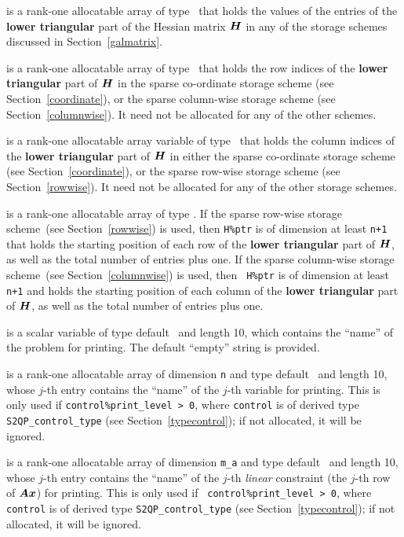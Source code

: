 \documentclass{galahad}
\newcommand{\packagename}{S2QP}
\begin{document}
\begin{description}
\begin{description}
 is a rank-one allocatable array of type \realdp\ that holds
the values of the entries of the {\bf lower triangular} part
of the Hessian matrix ${\bm{H}}$ in any of the 
storage schemes discussed in Section~\ref{galmatrix}.

 is a rank-one allocatable array of type \integer\
that holds the row indices of the {\bf lower triangular} part of
${\bm{H}}$ in the sparse co-ordinate storage scheme (see
Section~\ref{coordinate}), or the sparse column-wise storage scheme
(see Section~\ref{columnwise}).  It need not be allocated for any of
the other schemes.

 is a rank-one allocatable array variable of type \integer\
that holds the column indices of the {\bf lower triangular} part of 
${\bm{H}}$ in either the sparse co-ordinate storage scheme 
(see Section~\ref{coordinate}), or the sparse row-wise 
storage scheme (see Section~\ref{rowwise}).
It need not be allocated for any of the other storage schemes.

 is a rank-one allocatable array of type \integer.
If the sparse row-wise storage scheme~(see Section~\ref{rowwise}) is
used, then {\tt H\%ptr} is of dimension at least {\tt n+1} that holds the starting position
of each row of the {\bf lower triangular} part of ${\bm{H}}$, as well as
the total number of entries plus one.  If the sparse column-wise
storage scheme~(see Section~\ref{columnwise}) is used, then {\tt
  H\%ptr} is of dimension at least {\tt n+1} and holds the starting position of each column
of the {\bf lower triangular} part of ${\bm{H}}$, as well as the total
number of entries plus one.

\end{description}

 is a scalar variable of type 
default \character\ and length 10, which contains the
``name'' of the problem for printing. The default ``empty'' string is
provided.

 is a rank-one allocatable array of dimension {\tt n} and type 
default \character\ and length 10, whose $j$-th entry contains the
``name'' of the $j$-th variable for printing. This is only used 
if {\tt control\%print\_level > 0}, where {\tt control} is of derived
type {\tt \packagename\_control\_type} (see
Section~\ref{typecontrol}); if not allocated, it will be ignored.

\itt{ANAMES} is a rank-one allocatable array of dimension {\tt m\_a}
and type default \character\ and length 10, whose $j$-th entry
contains the ``name'' of the $j$-th {\em linear} constraint (the
$j$-th row of ${\bm{A}}{\bm{x}}$) for printing.  This is only used if {\tt
  control\%print\_level > 0}, where {\tt control} is of derived type
{\tt \packagename\_control\_type} (see Section~\ref{typecontrol}); if
not allocated, it will be ignored.


\end{description}
\end{document}
